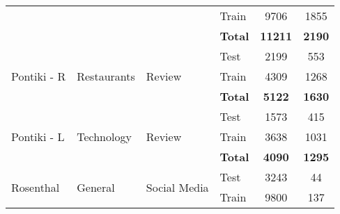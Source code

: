 \documentclass[../../fyp.tex]{subfiles}
\begin{document}
\begin{table}
\begin{tabular}{|l|l|l|l|c|c|}
		                                       &                                      &                                    & Train                               & 9706                               & 1855                               \\ \cline{4-6}
		                                       &                                      &                                    & \textbf{Total}                      & \textbf{11211}                     & \textbf{2190}                      \\ \hline\hline
		\multirow{3}{*}{Pontiki - R}           & \multirow{3}{*}{Restaurants}         & \multirow{3}{*}{Review}            & Test                                & 2199                               & 553                                \\
		                                       &                                      &                                    & Train                               & 4309                               & 1268                               \\ \cline{4-6}
		                                       &                                      &                                    & \textbf{Total}                      & \textbf{5122}                      & \textbf{1630}                      \\ \hline\hline
		\multirow{3}{*}{Pontiki - L}           & \multirow{3}{*}{Technology}          & \multirow{3}{*}{Review}            & Test                                & 1573                               & 415                                \\
		                                       &                                      &                                    & Train                               & 3638                               & 1031                                \\ \cline{4-6}
		                                       &                                      &                                    & \textbf{Total}                      & \textbf{4090}                      & \textbf{1295}                      \\ \hline\hline
		\multirow{3}{*}{Rosenthal}             & \multirow{3}{*}{General}             & \multirow{3}{*}{Social Media}      & Test                                & 3243                               & 44                                 \\
		                                       &                                      &                                    & Train                               & 9800                               & 137                                \\ \cline{4-6}

\end{tabular}
\end{table}
\end{document}
